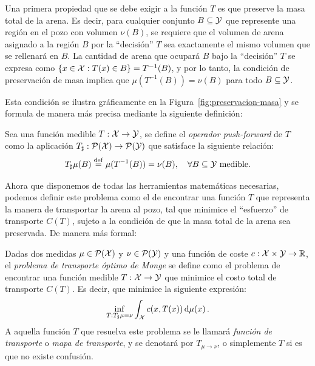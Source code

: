 {{	  Una primera propiedad que se debe exigir a la función $T$ es que preserve la masa total de la arena. Es decir, para cualquier conjunto $B \subseteq \cY$ que represente una región en el pozo con volumen $\nu(B)$, se requiere que el volumen de arena asignado a la región $B$ por la ``decisión'' $T$ sea exactamente el mismo volumen que se rellenará en $B$. La cantidad de arena que ocupará $B$ bajo la ``decisión'' $T$ se expresa como $\left\{ x \in \cX : T(x) \in B \right\} = T^{-1}(B)$, y por lo tanto, la condición de preservación de masa implica que $\mu(T^{-1}(B)) = \nu(B)$ para todo $B \subseteq \cY$.

	  Esta condición se ilustra gráficamente en la Figura~\ref{fig:preservacion-masa} y se formula de manera más precisa mediante la siguiente definición:

	  \begin{definition}
		  Sea una función medible $T:\cX \to \cY$, se define el \emph{operador push-forward}  de $T$ como la aplicación $\Tpf:\ProbSpace[\cX] \to \ProbSpace[\cY]$ que satisface la siguiente relación:
		  \begin{equation}
			  \label{eq:pushForward}
			  \Tpf \mu(B) \eqdef \mu (T^{-1}(B)) = \nu(B),\quad \forall B \subseteq \cY \text{ medible}.
		  \end{equation}
	  \end{definition}

	  Ahora que disponemos de todas las herramientas matemáticas necesarias, podemos definir este problema como el de encontrar una función $T$ que representa la manera de transportar la arena al pozo, tal que minimice el ``esfuerzo'' de transporte $C(T)$, sujeto a la condición de que la masa total de la arena sea preservada. De manera más formal:

	  \begin{definition}
		  Dadas dos medidas $\mu \in \ProbSpace[\cX]$ y $\nu \in \ProbSpace[\cY]$ y una función de coste $c : \cX \times \cY \to \R$, el \emph{problema de transporte óptimo de Monge} se define como el problema de encontrar una función medible $T: \cX \to \cY$ que minimice el costo total de transporte $C(T)$. Es decir, que minimice la siguiente expresión:
		  \begin{equation}
			  \label{eq:problemaTransporteMonge}
			  \inf_{T: \Tpf \mu = \nu} \int_{\cX} c(x, T(x)) \dmu[x].
		  \end{equation}
		  A aquella función $T$ que resuelva este problema se le llamará \emph{función de transporte} o \emph{mapa de transporte}, y se denotará por $T_{\mu \to \nu}$, o simplemente $T$ si es que no existe confusión.
	  \end{definition}

}}
